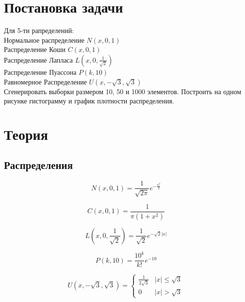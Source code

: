 \documentclass[a4]{article}
\begin{document}
	
	\newpage
	\tableofcontents{}
	\newpage
	\listoffigures
	\newpage
	
	
	\section{Постановка задачи}
	
	Для 5-ти рапределений:\\
		Нормальное распределение $N(x,0,1)$\\
		Распределение Коши $C(x,0,1)$\\
		Распределение Лапласа $L( x,0,\frac{1}{\sqrt{2}})$\\
		Распределение Пуассона $P(k, 10)$\\
		Равномерное Распределение $U(x,-\sqrt{3}, \sqrt{3})$\\
		
		Сгенерировать выборки размером 10, 50 и 1000 элементов.
		Построить на одном рисунке гистограмму и график плотности распределения.
		
	
	\section{Теория}
		\subsection{Распределения}
		
			\begin{equation}\label{eqn:normal}
			N(x,0,1) = \frac{1}{\sqrt{2\pi}}e^{-\frac{x^2}{2}}
			\end{equation} 
			
			\begin{equation}\label{eqn:cauchy}
			C(x,0,1) = \frac{1}{\pi(1+x^2)}
			\end{equation}
			
			\begin{equation}\label{eqn:laplace}
			L\left( x,0,\frac{1}{\sqrt{2}}\right) = \frac{1}{\sqrt{2}}e^{-\sqrt{2}\vert x\vert}
			\end{equation}
			
			\begin{equation}\label{eqn:poisson}
			P(k,10) = \frac{10^k}{k!}e^{-10}
			\end{equation}  
			
			\begin{equation}\label{eqn:uniform}
			U(x,-\sqrt{3}, \sqrt{3}) = 
			\begin{cases}
			\frac{1}{2\sqrt{3}} &\vert x\vert \leqslant \sqrt{3}\\
			0 &\vert x\vert > \sqrt{3}
			\end{cases}
			\end{equation}
		
\end{document}
